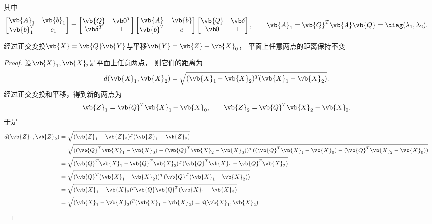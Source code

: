 其中\[
	\begin{bmatrix}
		\vb{A}_1 & \vb{b}_1 \\
		\vb{b}_1^T & c_1
	\end{bmatrix}
	= \begin{bmatrix}
		\vb{Q} & \vb0^T \\
		\vb\delta^T & 1
	\end{bmatrix}
	\begin{bmatrix}
		\vb{A} & \vb{b} \\
		\vb{b}^T & c
	\end{bmatrix}
	\begin{bmatrix}
		\vb{Q} & \vb\delta \\
		\vb0 & 1
	\end{bmatrix},
	\qquad
	\vb{A}_1
	= \vb{Q}^T \vb{A} \vb{Q}
	= \diag(\lambda_1,\lambda_2).
\]

\begin{lemma}
经过正交变换\(\vb{X} = \vb{Q} \vb{Y}\)与平移\(\vb{Y} = \vb{Z} + \vb{X}_0\)，
平面上任意两点的距离保持不变.
\begin{proof}
设\(\vb{X}_1,\vb{X}_2\)是平面上任意两点，
则它们的距离为\[
	d(\vb{X}_1,\vb{X}_2)
	= \sqrt{(\vb{X}_1-\vb{X}_2)^T(\vb{X}_1-\vb{X}_2)}.
\]
经过正交变换和平移，得到新的两点为\[
	\vb{Z}_1 = \vb{Q}^T \vb{X}_1 - \vb{X}_0,
	\qquad
	\vb{Z}_2 = \vb{Q}^T \vb{X}_2 - \vb{X}_0.
\]
于是\begin{align*}
	d(\vb{Z}_1,\vb{Z}_2)
	&= \sqrt{(\vb{Z}_1-\vb{Z}_2)^T(\vb{Z}_1-\vb{Z}_2)} \\
	&= \sqrt{
		((\vb{Q}^T \vb{X}_1 - \vb{X}_0) - (\vb{Q}^T \vb{X}_2 - \vb{X}_0))^T
		((\vb{Q}^T \vb{X}_1 - \vb{X}_0) - (\vb{Q}^T \vb{X}_2 - \vb{X}_0))
	} \\
	&= \sqrt{
		(\vb{Q}^T \vb{X}_1 - \vb{Q}^T \vb{X}_2)^T
		(\vb{Q}^T \vb{X}_1 - \vb{Q}^T \vb{X}_2)
	} \\
	&= \sqrt{
		(\vb{Q}^T (\vb{X}_1 - \vb{X}_2))^T
		(\vb{Q}^T (\vb{X}_1 - \vb{X}_2))
	} \\
	&= \sqrt{
		(\vb{X}_1 - \vb{X}_2)^T
		\vb{Q} \vb{Q}^T
		(\vb{X}_1 - \vb{X}_2)
	} \\
	&= \sqrt{
		(\vb{X}_1 - \vb{X}_2)^T
		(\vb{X}_1 - \vb{X}_2)
	}
	= d(\vb{X}_1,\vb{X}_2).
	\qedhere
\end{align*}
\end{proof}
\end{lemma}
